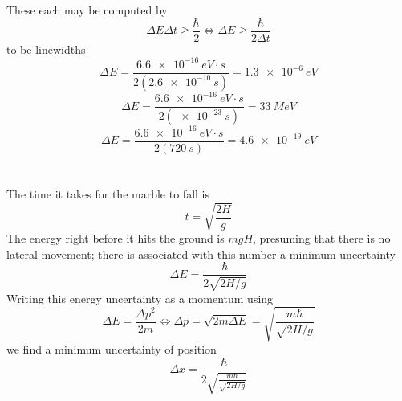 \documentclass{article}
\begin{document}
\section{}
These each may be computed by
\[\Delta E\Delta t\geq \frac{\hbar}{2}\Leftrightarrow \Delta E\geq\frac{\hbar}{2\Delta t}\]
to be linewidths
\[\Delta E=\frac{\SI{6.6e-16}{eV\cdot s}}{2(\SI{2.6e-10}{s})}=\SI{1.3e-6}{eV}\]
\[\Delta E=\frac{\SI{6.6e-16}{eV\cdot s}}{2(\SI{e-23}{s})}=\SI{33}{MeV}\]
\[\Delta E=\frac{\SI{6.6e-16}{eV\cdot s}}{2(\SI{720}{s})}=\SI{4.6e-19}{eV}\]

\section{}
The time it takes for the marble to fall is
\[t=\sqrt{\frac{2H}{g}}\]
The energy right before it hits the ground is $mgH$, presuming that there is no lateral movement; there is associated with this number a minimum uncertainty
\[\Delta E=\frac{\hbar}{2\sqrt{2H/g}}\]
Writing this energy uncertainty as a momentum using
\[\Delta E=\frac{\Delta p^2}{2m}\Leftrightarrow \Delta p=\sqrt{2m\Delta E}=\sqrt{\frac{m\hbar}{\sqrt{2H/g}}}\]
we find a minimum uncertainty of position
\[\Delta x=\frac{\hbar}{2\sqrt{\frac{m\hbar}{\sqrt{2H/g}}}}\]
\end{document}
